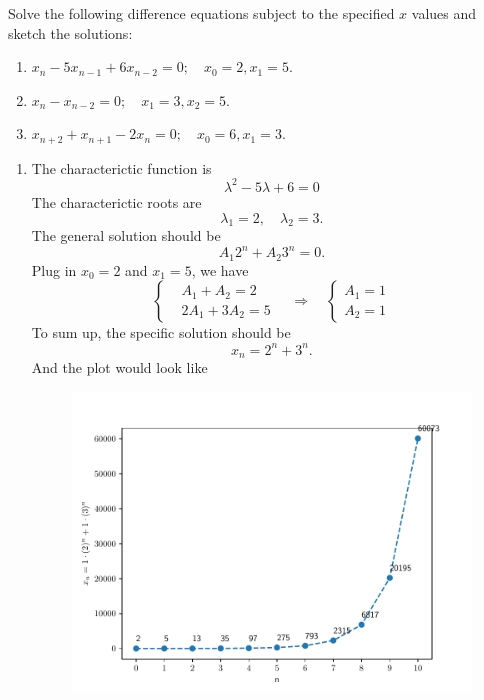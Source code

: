 \begin{homeworkProblem}
    Solve the following difference equations subject to the specified $x$ values and
    sketch the solutions:
    \begin{enumerate}
        \item $x_n - 5x_{n-1} + 6x_{n-2} = 0;\quad x_0 = 2, x_1 = 5.$
        \addtocounter{enumi}{1}
        \item $x_n - x_{n-2} = 0;\quad x_1 = 3, x_2 = 5.$
        \addtocounter{enumi}{1}
        \item $x_{n+2} + x_{n+1} - 2x_n = 0; \quad x_0 = 6, x_1 = 3.$
    \end{enumerate}
    
    \segline
    
    \solution
    
    \begin{enumerate}
        \item The characterictic function is \[
            \lambda^2 - 5\lambda + 6 = 0
        \]
        The characterictic roots are \[
            \lambda_1 = 2, \quad \lambda_2 = 3.
        \]
        The general solution should be \[
            A_1 2^n + A_2 3^n  = 0.
        \]
        Plug in $x_0 = 2$ and $x_1 = 5$, we have \[
            \left\{
            \begin{aligned}
                &A_1 + A_2  = 2\\
                &2A_1  + 3A_2 = 5
            \end{aligned}
            \right.
            \quad
            \Rightarrow
            \quad
            \left\{
            \begin{aligned}
                A_1 = 1\\
                A_2 = 1
            \end{aligned}
            \right.
        \]
        To sum up, the specific solution should be $$
            x_n = 2^n + 3^n.
        $$
        And the plot would look like
        \begin{figure}[H]
            \centering
            \includegraphics[scale=0.5]{fig/fig2(a).pdf}
        \end{figure}
        \addtocounter{enumi}{1}
    

\end{enumerate}
\end{homeworkProblem}
